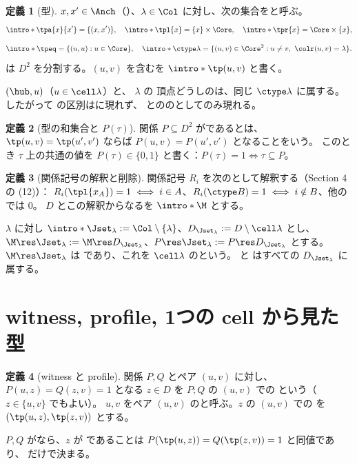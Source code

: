 \documentclass[11pt,a4paper]{ltjsarticle}
\theoremstyle{definition}
\newtheorem{definition}{定義}
\begin{document}
\begin{definition}[型]
$x,x'\in \Anch$（）、$\lambda\in\Col$ に対し、次の集合を\AP{}と呼ぶ。
\[
 \intro*\tpa{x}{x'}=\{(x,x')\},\quad \intro*\tpl{x}=\{x\}\times \Core,\quad \intro*\tpr{x}=\Core\times\{x\},
\]
\[
 \intro*\tpeq=\{(u,u):u\in \Core\},\quad \intro*\ctype\lambda=\{(u,v)\in \Core^2:u\ne v,\ \colr(u,v)=\lambda\}.
\]
は $D^2$ を分割する。$(u,v)$ を含むを $\intro*\tp(u,v)$ と書く。
\end{definition}
$(\hub,u)$（$u\in\cell\lambda$）と、 $\lambda$ の  頂点どうしのは、同じ $\ctype\lambda$ に属する。したがって  の区別はに現れず、 とののとしてのみ現れる。

\begin{definition}[型の和集合と $P(\tau)$]
関係 $P\subseteq D^2$ が\AP{}であるとは、$\tp(u,v)=\tp(u',v')$ ならば $P(u,v)=P(u',v')$ となることをいう。
このとき $\tau$ 上の共通の値を $P(\tau)\in\{0,1\}$ と書く：$P(\tau)=1\iff\tau\subseteq P$。
\end{definition}

\begin{definition}[関係記号の解釈と削除]
関係記号 $R_i$ を次のとして解釈する（Section 4 の (12)）：
$R_i(\tpl{x_A})=1\iff i\in A$、$R_i(\ctype B)=1\iff i\notin B$、他のでは $0$。
 $D$ とこの解釈からなるを $\intro*\M$ とする。

 $\lambda$ に対し $\intro*\Jset_\lambda:=\Col\setminus\{\lambda\}$、$D_{\Jset_\lambda}:=D\setminus\cell\lambda$ とし、
$\M\res \Jset_\lambda:=\M\res D_{\Jset_\lambda}$、$P\res \Jset_\lambda:=P\res D_{\Jset_\lambda}$ とする。$\M\res\Jset_\lambda$ は であり、これを $\cell\lambda$ の\AP{}という。 と  はすべての $D_{\Jset_\lambda}$ に属する。
\end{definition}

\section{witness, profile, 1つの cell から見た型}
\begin{definition}[witness と profile]
関係 $P,Q$ とペア $(u,v)$ に対し、$P(u,z)=Q(z,v)=1$ となる $z\in D$ を $P;Q$ の $(u,v)$ での \AP{} という（$z\in\{u,v\}$ でもよい）。
$u,v$ をペア $(u,v)$ のと呼ぶ。$z$ の $(u,v)$ での \AP{} を $(\tp(u,z),\tp(z,v))$ とする。
\end{definition}
$P,Q$ がなら、$z$ が  であることは $P(\tp(u,z))=Q(\tp(z,v))=1$ と同値であり、 だけで決まる。
\end{document}
